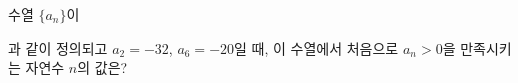 수열 $\{a_n\}$이\par\smallskip{}\par\smallskip\noindent 과 같이 정의되고 $a_2=-32$, $a_6=-20$일 때, 이 수열에서 처음으로 $a_n>0$을 만족시키는 자연수 $n$의 값은?
